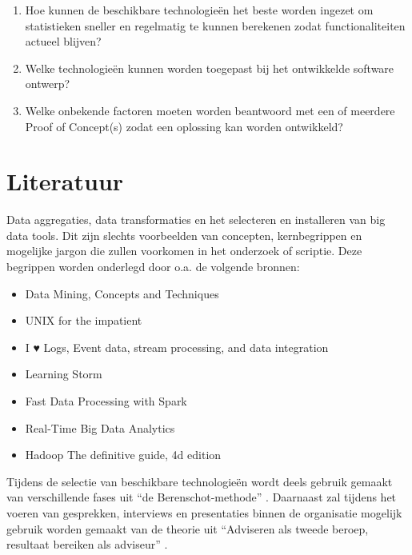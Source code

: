 \begin{enumerate}
\begin{enumerate}
    \item Hoe kunnen de beschikbare technologieën het beste worden ingezet om statistieken sneller en regelmatig te kunnen berekenen zodat functionaliteiten actueel blijven?

    \item Welke technologieën kunnen worden toegepast bij het ontwikkelde software ontwerp?

    \item Welke onbekende factoren moeten worden beantwoord met een of meerdere Proof of Concept(s) zodat een oplossing kan worden ontwikkeld?
    \end{enumerate}
\end{enumerate}


\section{Literatuur} %

Data aggregaties, data transformaties en het selecteren en installeren van big data tools. Dit zijn slechts voorbeelden van concepten, kernbegrippen en mogelijke jargon die zullen voorkomen in het onderzoek of scriptie. Deze begrippen worden onderlegd door o.a. de volgende bronnen:

\begin{itemize}
    \item Data Mining, Concepts and Techniques \parencite{data-mining}
    \item UNIX for the impatient \parencite{unix}
    \item I ♥ Logs, Event data, stream processing, and data integration \parencite{logs}
    \item Learning Storm \parencite{learning-storm}
    \item Fast Data Processing with Spark \parencite{spark}
    \item Real-Time Big Data Analytics \parencite{realtime-architectures}
    \item Hadoop The definitive guide, 4d edition \parencite{hadoop-definitive}
\end{itemize}

Tijdens de selectie van beschikbare technologieën wordt deels gebruik gemaakt van verschillende fases uit “de Berenschot-methode” \parencite{cuppen}.
Daarnaast zal tijdens het voeren van gesprekken, interviews en presentaties binnen de organisatie mogelijk gebruik worden gemaakt van de theorie uit “Adviseren als tweede beroep, resultaat bereiken als adviseur” \parencite{adviseren}.

